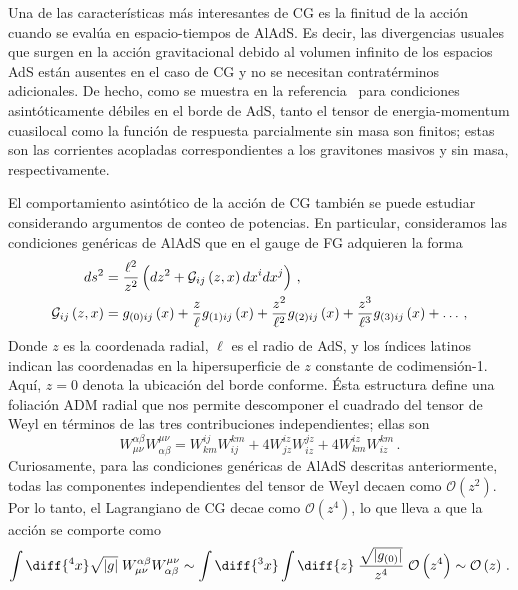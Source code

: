 \documentclass[../Main.tex]{subfiles}
\begin{document}
Una de las características más interesantes de CG es la finitud de la acción cuando se evalúa en espacio-tiempos de AlAdS. Es decir, las divergencias usuales que surgen en la acción gravitacional debido al volumen infinito de los espacios AdS están ausentes en el caso de CG y no se necesitan contratérminos adicionales. De hecho, como se muestra en la referencia~\cite{Grumiller:2013mxa} para condiciones asintóticamente débiles en el borde de AdS, tanto el tensor de energia-momentum cuasilocal como la función de respuesta parcialmente sin masa son finitos; estas son las corrientes acopladas correspondientes a los gravitones masivos y sin masa, respectivamente. 

El comportamiento asintótico de la acción de CG también se puede estudiar considerando argumentos de conteo de potencias. En particular, consideramos las condiciones genéricas de AlAdS que en el gauge de FG adquieren la forma
\begin{align}
ds^{2}&= \frac{\ell^2}{z^2} \left(dz^{2}+ \mathcal{G}_{i j} \left(z,x\right) dx^{i} dx^{j} \right)\,, \notag \\
\mathcal{G}_{i j} \left(z,x\right) &= g_{\left(0\right) ij} \left(x\right) + \frac{z}{\ell} g_{\left(1\right) ij} \left(x\right) + \frac{z^2}{\ell^2} g_{\left(2\right) ij} \left(x\right) + \frac{z^3}{\ell^3} g_{\left(3\right) ij} \left(x\right)+ \ldots \,,
\end{align}
Donde $z$ es la coordenada radial, $\ell$ es el radio de AdS, y los índices latinos indican las coordenadas en la hipersuperficie de $z$ constante de codimensión-1. Aquí, $z=0$ denota la ubicación del borde conforme. Ésta estructura define una foliación ADM radial que nos permite descomponer el cuadrado del tensor de Weyl en términos de las tres contribuciones independientes; ellas son
\begin{equation}
W^{\alpha \beta}_{\mu \nu} W^{\mu \nu}_{\alpha \beta} = W^{ij}_{km} W^{km}_{ij} + 4 W^{iz}_{jz} W^{jz}_{iz} + 4 W^{iz}_{km}W^{km}_{iz} \,.
\end{equation}
Curiosamente, para las condiciones genéricas de AlAdS descritas anteriormente, todas las componentes independientes del tensor de Weyl decaen como $\mathcal{O} \left(z^2\right)$. Por lo tanto, el Lagrangiano de CG decae como $\mathcal{O} \left(z^4\right)$, lo que lleva a que la acción se comporte como
\begin{equation}
\int\diff{^4x}\sqrt{|g|}\; W^{\alpha \beta}_{\mu \nu} W^{\mu \nu}_{\alpha \beta} \sim \int \diff{^3x} \int \diff{z}\; \frac{\sqrt{|g_{\left(0\right)}|}}{z^4}\; \mathcal{O} \left(z^4\right) \sim \mathcal{O} \left(z\right) \,.
\end{equation}
\end{document}

